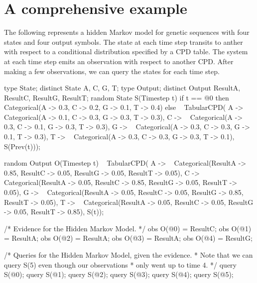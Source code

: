 \documentclass[12pt]{article}
\begin{document}
\section{A comprehensive example}
\begin{example}
The following represents a hidden Markov model for genetic sequences with four states and four output symbols. The state at each time step  transits to anther with respect to a conditional distribution specified by a CPD table. 
The system at each time step emits an observation with respect to another  CPD. After making a few observations, we can query the states for each time step.
\end{example}

\begin{blogcode}
type State;
distinct State A, C, G, T;
type Output;
distinct Output ResultA, ResultC, ResultG, ResultT;
random State S(Timestep t)
  if t == @0 then 
    ~ Categorical({A -> 0.3, C -> 0.2, G -> 0.1, T -> 0.4})
  else ~ TabularCPD(
    {A -> ~ Categorical({A -> 0.1, C -> 0.3, G -> 0.3, T -> 0.3}),
     C -> ~ Categorical({A -> 0.3, C -> 0.1, G -> 0.3, T -> 0.3}),
     G -> ~ Categorical({A -> 0.3, C -> 0.3, G -> 0.1, T -> 0.3}),
     T -> ~ Categorical({A -> 0.3, C -> 0.3, G -> 0.3, T -> 0.1})},
    S(Prev(t)));

random Output O(Timestep t)
  ~ TabularCPD(
    {A -> ~ Categorical({ResultA -> 0.85, ResultC -> 0.05,
                         ResultG -> 0.05, ResultT -> 0.05}),
    C -> ~ Categorical({ResultA -> 0.05, ResultC -> 0.85, 
                        ResultG -> 0.05, ResultT -> 0.05}),
    G -> ~ Categorical({ResultA -> 0.05, ResultC -> 0.05, 
                        ResultG -> 0.85, ResultT -> 0.05}),
    T -> ~ Categorical({ResultA -> 0.05, ResultC -> 0.05, 
                        ResultG -> 0.05, ResultT -> 0.85})},
    S(t));

/* Evidence for the Hidden Markov Model.
 */
obs O(@0) = ResultC;
obs O(@1) = ResultA;
obs O(@2) = ResultA;
obs O(@3) = ResultA;
obs O(@4) = ResultG;

/* Queries for the Hidden Markov Model, given the evidence.  
 * Note that we can query S(5) even though our observations 
 * only went up to time 4.
 */
query S(@0);
query S(@1);
query S(@2);
query S(@3);
query S(@4);
query S(@5);
\end{blogcode}
\end{document}
